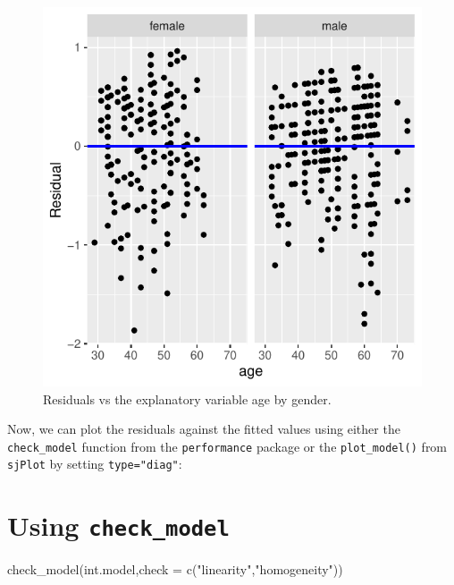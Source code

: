 \documentclass[
  letterpaper,
  DIV=11,
  numbers=noendperiod]{scrartcl}
\newenvironment{Shaded}{\begin{snugshade}}{\end{snugshade}}
\newcommand{\AttributeTok}[1]{\textcolor[rgb]{0.40,0.45,0.13}{#1}}
\newcommand{\FunctionTok}[1]{\textcolor[rgb]{0.28,0.35,0.67}{#1}}
\newcommand{\NormalTok}[1]{\textcolor[rgb]{0.00,0.23,0.31}{#1}}
\newcommand{\StringTok}[1]{\textcolor[rgb]{0.13,0.47,0.30}{#1}}
\begin{document}
\begin{figure}[H]

{\centering \includegraphics{notes_files/figure-pdf/unnamed-chunk-11-1.pdf}

}

\caption{Residuals vs the explanatory variable age by gender.}

\end{figure}%

Now, we can plot the residuals against the fitted values using either
the \texttt{check\_model} function from the \texttt{performance} package
or the \texttt{plot\_model()} from \texttt{sjPlot} by setting
\texttt{type="diag"}:

\section{\texorpdfstring{Using
\texttt{check\_model}}{Using check\_model}}

\begin{Shaded}
\begin{Highlighting}[]
\FunctionTok{check\_model}\NormalTok{(int.model,}\AttributeTok{check =} \FunctionTok{c}\NormalTok{(}\StringTok{"linearity"}\NormalTok{,}\StringTok{"homogeneity"}\NormalTok{))}
\end{Highlighting}
\end{Shaded}
\end{document}
